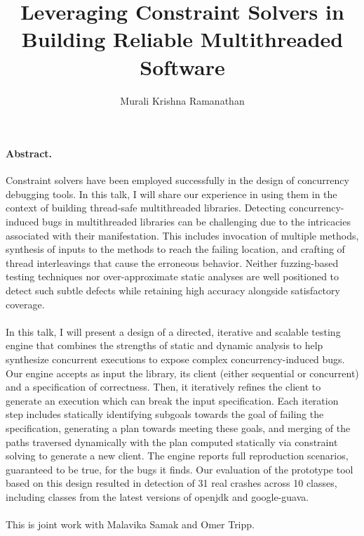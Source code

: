 \documentclass[EPiCempty]{easychair}
\begin{document}
\title{Leveraging Constraint Solvers in Building Reliable Multithreaded Software}
\author{Murali Krishna Ramanathan}


\maketitle
\paragraph{Abstract.}
Constraint solvers have been employed successfully in the design of concurrency
debugging tools. In this talk, I will share our experience in using them in the
context of building thread-safe multithreaded libraries. Detecting
concurrency-induced bugs in multithreaded libraries can be challenging due to
the intricacies associated with their manifestation. This includes invocation
of multiple methods, synthesis of inputs to the methods to reach the failing
location, and crafting of thread interleavings that cause the erroneous
behavior. Neither fuzzing-based testing techniques nor over-approximate static
analyses are well positioned to detect such subtle defects while retaining high
accuracy alongside satisfactory coverage.
\\\\
In this talk, I will present a design of a directed, iterative and scalable
testing engine that combines the strengths of static and dynamic analysis to
help synthesize concurrent executions to expose complex concurrency-induced
bugs. Our engine accepts as input the library, its client (either sequential or
concurrent) and a specification of correctness. Then, it iteratively refines
the client to generate an execution which can break the input
specification. Each iteration step includes statically identifying subgoals
towards the goal of failing the specification, generating a plan towards
meeting these goals, and merging of the paths traversed dynamically with the
plan computed statically via constraint solving to generate a new client. The
engine reports full reproduction scenarios, guaranteed to be true, for the bugs
it finds. Our evaluation of the prototype tool based on this design resulted in
detection of 31 real crashes across 10 classes, including classes from the
latest versions of openjdk and google-guava.
\\\\
This is joint work with Malavika Samak and Omer Tripp.
\end{document}
